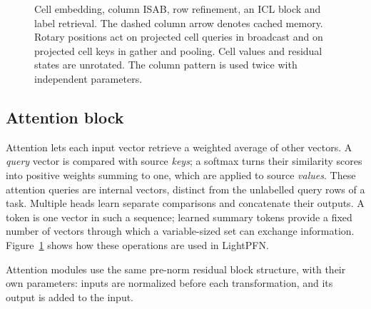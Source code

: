\documentclass[11pt]{article}
\begin{document}
\begin{figure}[tbp]
\centering
\resizebox{\linewidth}{!}{}
\caption{Cell embedding, column ISAB, row refinement, an ICL block and label retrieval. The dashed column arrow
denotes cached memory. Rotary positions act on projected cell queries in
broadcast and on projected cell keys in gather and pooling. Cell values and residual states are
unrotated. The column pattern is used twice with independent parameters.}
\label{fig:arch-details}
\end{figure}

\subsection{Attention block}
Attention lets each input vector retrieve a weighted average of other vectors. A \emph{query}
vector is compared with source \emph{keys}; a softmax turns their similarity scores into positive
weights summing to one, which are applied to source \emph{values}. These attention queries are
internal vectors, distinct from the unlabelled query rows of a task. Multiple heads learn separate
comparisons and concatenate their outputs. A token is one vector in such a sequence; learned
summary tokens provide a fixed number of vectors through which a variable-sized set can exchange
information. Figure~\ref{fig:arch-details} shows how these operations are used in LightPFN.

Attention modules use the same pre-norm residual block structure, with their own parameters:
inputs are normalized before each transformation, and its output is added to the input.
\end{document}
